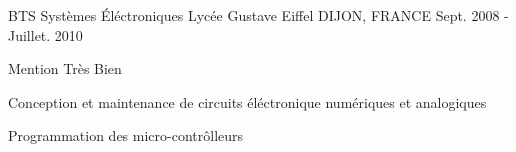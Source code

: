 \begin{cventries}
  \cventry
    {BTS Systèmes \'Eléctroniques} %
    {Lycée Gustave Eiffel} %
    {DIJON, FRANCE} %
    {Sept. 2008 - Juillet. 2010} %
    {
      \begin{cvitems} %
      \item {Mention Très Bien}
      \item {Conception et maintenance de circuits éléctronique numériques et analogiques}
      \item {Programmation des micro-contrôlleurs}
      \end{cvitems}
    }
\end{cventries}
